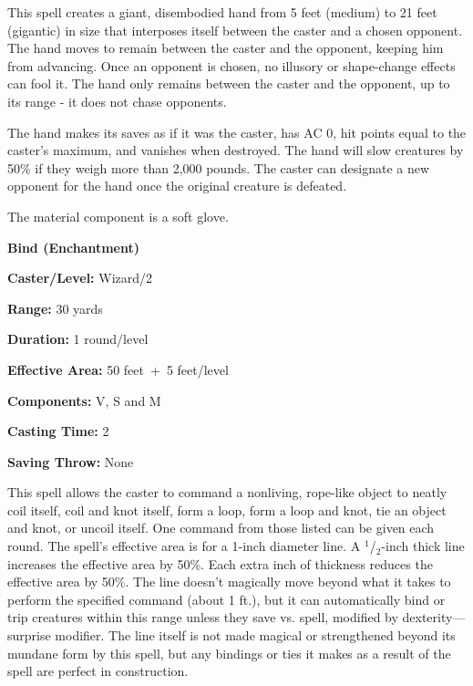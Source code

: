 \begin{multicols}{2}
This spell creates a giant, disembodied hand from 5 feet (medium) to 21 feet (gigantic) in size that interposes itself between the caster and a chosen opponent.  The hand moves to remain between the caster and the opponent, keeping him from advancing.  Once an opponent is chosen, no illusory or shape-change effects can fool it.  The hand only remains between the caster and the opponent, up to its range - it does not chase opponents.

The hand makes its saves as if it was the caster, has AC 0, hit points equal to the caster's maximum, and vanishes when destroyed.  The hand will slow creatures by 50\% if they weigh more than 2,000 pounds.  The caster can designate a new opponent for the hand once the original creature is defeated.

The material component is a soft glove.

\vspace{1em}

\noindent
\begin{minipage}{\columnwidth}

\noindent \textbf{Bind (Enchantment)}

\noindent \textbf{Caster/Level:} Wizard/2

\noindent \textbf{Range:} 30 yards

\noindent \textbf{Duration:} 1 round/level

\noindent \textbf{Effective Area:} 50 feet~+~5 feet/level

\noindent \textbf{Components:} V, S and M

\noindent \textbf{Casting Time:} 2

\noindent \textbf{Saving Throw:} None

\end{minipage}

This spell allows the caster to command a nonliving, rope-like object to neatly coil itself, coil and knot itself, form a loop, form a loop and knot, tie an object and knot, or uncoil itself.  One command from those listed can be given each round.  The spell's effective area is for a 1-inch diameter line.  A $^1$/$_2$-inch thick line increases the effective area by 50\%.  Each extra inch of thickness reduces the effective area by 50\%.  The line doesn't magically move beyond what it takes to perform the specified command (about 1 ft.), but it can automatically bind or trip creatures within this range unless they save vs. spell, modified by dexterity---surprise modifier.  The line itself is not made magical or strengthened beyond its mundane form by this spell, but any bindings or ties it makes as a result of the spell are perfect in construction.  


\end{multicols}
